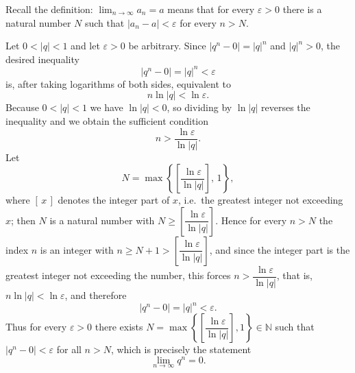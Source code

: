 \documentclass[11pt,a4paper]{article}
\newenvironment{solution}[1]{%
  \par\addvspace{1.7ex}%
  \noindent{\color{solutioncolor}\textbf{#1}}\hspace{0.55em}\ignorespaces}%
  {\par\addvspace{0.9ex}}
\begin{document}
\begin{solution}{Solution 2.1.2}\label{es:2.1.2}
Recall the definition: $\displaystyle\lim_{n\to\infty}a_{n}=a$ means that for every $\varepsilon>0$ there is a natural number $N$ such that $\lvert a_{n}-a\rvert<\varepsilon$ for every $n>N$.

Let $0<\lvert q\rvert<1$ and let $\varepsilon>0$ be arbitrary. Since $\lvert q^{n}-0\rvert=\lvert q\rvert^{n}$ and $\lvert q\rvert^{n}>0$, the desired inequality
\[
\lvert q^{n}-0\rvert=\lvert q\rvert^{n}<\varepsilon
\]
is, after taking logarithms of both sides, equivalent to
\[
n\ln\lvert q\rvert<\ln\varepsilon .
\]
Because $0<\lvert q\rvert<1$ we have $\ln\lvert q\rvert<0$, so dividing by $\ln\lvert q\rvert$ reverses the inequality and we obtain the sufficient condition
\[
n>\frac{\ln\varepsilon}{\ln\lvert q\rvert}.
\]
Let
\[
N=\max\left\{\left[\frac{\ln\varepsilon}{\ln\lvert q\rvert}\right],\,1\right\},
\]
where $[\,x\,]$ denotes the integer part of $x$, i.e.\ the greatest integer not exceeding $x$; then $N$ is a natural number with $N\ge\left[\dfrac{\ln\varepsilon}{\ln\lvert q\rvert}\right]$. Hence for every $n>N$ the index $n$ is an integer with $n\ge N+1>\left[\dfrac{\ln\varepsilon}{\ln\lvert q\rvert}\right]$, and since the integer part is the greatest integer not exceeding the number, this forces $n>\dfrac{\ln\varepsilon}{\ln\lvert q\rvert}$, that is, $n\ln\lvert q\rvert<\ln\varepsilon$, and therefore
\[
\lvert q^{n}-0\rvert=\lvert q\rvert^{n}<\varepsilon .
\]
Thus for every $\varepsilon>0$ there exists $N=\max\left\{\left[\dfrac{\ln\varepsilon}{\ln\lvert q\rvert}\right],1\right\}\in\mathbb{N}$ such that $\lvert q^{n}-0\rvert<\varepsilon$ for all $n>N$, which is precisely the statement
\[
\lim_{n\to\infty}q^{n}=0 .
\]
\end{solution}
\end{document}

